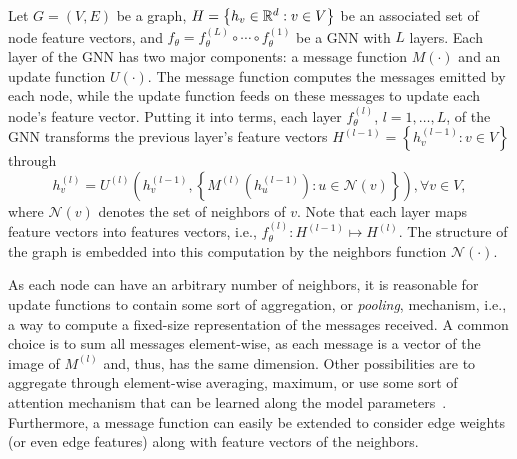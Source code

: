 Let $G=(V,E)$ be a graph, $H =\left\{ h_v\in \mathbb{R}^{d}: v\in V \right\} $ be an associated set of node feature vectors, and $f_\theta = f_\theta^{(L)} \circ \cdots \circ f_\theta^{(1)}$ be a GNN with $L$ layers.
Each layer of the GNN has two major components: a message function $M(\cdot)$ and an update function $U(\cdot)$.
The message function computes the messages emitted by each node, while the update function feeds on these messages to update each node's feature vector.
Putting it into terms, each layer $f^{(l)}_\theta$, $l=1,\ldots,L$, of the GNN transforms the previous layer's feature vectors $H^{(l-1)}=\left\{ h^{(l-1)}_v : v \in V \right\}$ through 
\[
     h^{(l)}_v = U^{(l)}\left( h^{(l-1)}_v , \left\{ M^{(l)}(h^{(l-1)}_u):u\in \mathcal{N}(v) \right\}  \right) , \forall v \in V
,\] where $\mathcal{N}(v)$ denotes the set of neighbors of $v$.
Note that each layer maps feature vectors into features vectors, i.e., $f_\theta^{(l)}: H^{(l-1)} \mapsto H^{(l)}$.
The structure of the graph is embedded into this computation by the neighbors function $\mathcal{N}(\cdot)$.

As each node can have an arbitrary number of neighbors, it is reasonable for update functions to contain some sort of aggregation, or \emph{pooling}, mechanism, i.e., a way to compute a fixed-size representation of the messages received.
A common choice is to sum all messages element-wise, as each message is a vector of the image of $M^{(l)}$ and, thus, has the same dimension.
Other possibilities are to aggregate through element-wise averaging, maximum, or use some sort of attention mechanism that can be learned along the model parameters~\cite{veličković2018graph}.
Furthermore, a message function can easily be extended to consider edge weights (or even edge features) along with feature vectors of the neighbors.

